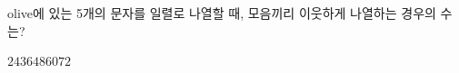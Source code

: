 olive에 있는 5개의 문자를 일렬로 나열할 때, 모음끼리 이웃하게 나열하는 경우의 수는?
\begin{choices32}{$24$}{$36$}{$48$}{$60$}{$72$}\end{choices32}
